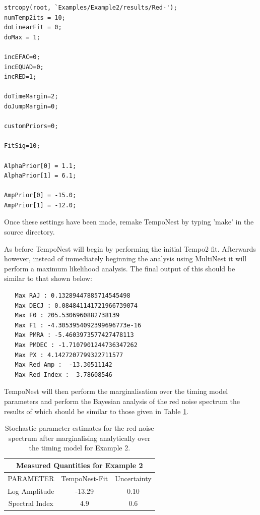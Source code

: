 \documentclass[%
 preprint,
 amsmath,amssymb,amsfonts,
 aps,
]{revtex4-1}
\begin{document}
\begin{lstlisting}
strcopy(root, `Examples/Example2/results/Red-');
numTemp2its = 10;
doLinearFit = 0;
doMax = 1;

incEFAC=0;
incEQUAD=0;
incRED=1;

doTimeMargin=2;
doJumpMargin=0;

customPriors=0;

FitSig=10;

AlphaPrior[0] = 1.1;
AlphaPrior[1] = 6.1;

AmpPrior[0] = -15.0;
AmpPrior[1] = -12.0;
\end{lstlisting}

Once these settings have been made, remake TempoNest by typing 'make' in the source directory.

As before TempoNest will begin by performing the initial Tempo2 fit.  Afterwards however, instead of immediately beginning the analysis using MultiNest it will perform a maximum likelihood analysis. The final output of this should be similar to that shown below:

\begin{lstlisting}
   Max RAJ : 0.13289447885714545498 
   Max DECJ : 0.084841141721966739074 
   Max F0 : 205.5306960882738139 
   Max F1 : -4.3053954092399696773e-16 
   Max PMRA : -5.4603973577427478113 
   Max PMDEC : -1.7107901244736347262 
   Max PX : 4.1427207799322711577 
   Max Red Amp :  -13.30511142 
   Max Red Index :  3.78608546
\end{lstlisting}

TempoNest will then perform the marginalisation over the timing model parameters and perform the Bayesian analysis of the red noise spectrum the results of which should be similar to those given in Table \ref{Table:Tempo2Fit2}.

\begin{table}
\begin{tabular}{ccc}
\hline\hline
\multicolumn{3}{c}{Measured Quantities for Example 2} \\ 
\hline
PARAMETER    &   TempoNest-Fit         &       Uncertainty  \\
\hline
Log Amplitude      &  -13.29  &        0.10   \\
Spectral Index      &   4.9  &      0.6     \\
\hline
\end{tabular}
\caption{Stochastic parameter estimates for the red noise spectrum after marginalising analytically over the timing model for Example 2.}
\label{Table:Tempo2Fit2}
\end{table}
\end{document}
